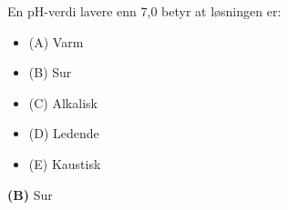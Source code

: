 

En pH-verdi lavere enn 7,0 betyr at løsningen er:

\begin{itemize}
\item{(A)} Varm
\vskip 5pt 
\item{(B)} Sur
\vskip 5pt 
\item{(C)} Alkalisk
\vskip 5pt 
\item{(D)} Ledende
\vskip 5pt 
\item{(E)} Kaustisk
\end{itemize}







{\bf (B)} Sur
 







